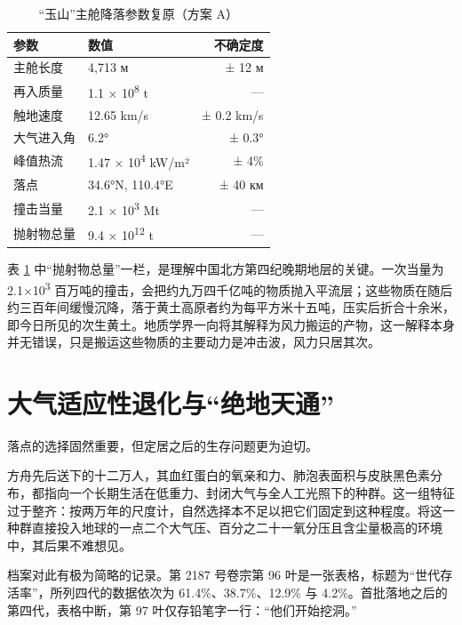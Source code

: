 \begin{table}[htbp]
\centering
\caption{“玉山”主舱降落参数复原（方案 A）}
\label{tab:landing}
\footnotesize
\begin{tabular}{@{}llr@{}}
\toprule
\textbf{参数} & \textbf{数值} & \textbf{不确定度}\\
\midrule
主舱长度 & 4{,}713 м & ± 12 м\\
再入质量 & 1.1 × 10\textsuperscript{8} t & —\\
触地速度 & 12.65 km/s & ± 0.2 km/s\\
大气进入角 & 6.2° & ± 0.3°\\
峰值热流 & 1.47 × 10\textsuperscript{4} kW/m² & ± 4\%\\
落点 & 34.6°N, 110.4°E & ± 40 км\\
撞击当量 & 2.1 × 10\textsuperscript{3} Mt & —\\
抛射物总量 & 9.4 × 10\textsuperscript{12} t & —\\
\bottomrule
\end{tabular}
\end{table}

表 \ref{tab:landing} 中“抛射物总量”一栏，是理解中国北方第四纪晚期地层的关键。一次当量为 2.1×10\textsuperscript{3} 百万吨的撞击，会把约九万四千亿吨的物质抛入平流层；这些物质在随后约三百年间缓慢沉降，落于黄土高原者约为每平方米十五吨，压实后折合十余米，即今日所见的次生黄土。地质学界一向将其解释为风力搬运的产物，这一解释本身并无错误，只是搬运这些物质的主要动力是冲击波，风力只居其次\nobreak。

\section{大气适应性退化与“绝地天通”}

落点的选择固然重要，但定居之后的生存问题更为迫切。

方舟先后送下的十二万人，其血红蛋白的氧亲和力、肺泡表面积与皮肤黑色素分布，都指向一个长期生活在低重力、封闭大气与全人工光照下的种群。这一组特征过于整齐：按两万年的尺度计，自然选择本不足以把它们固定到这种程度。将这一种群直接投入地球的一点二个大气压、百分之二十一氧分压且含尘量极高的环境中，其后果不难想见。

档案对此有极为简略的记录。第 2187 号卷宗第 96 叶是一张表格，标题为“世代存活率”，所列四代的数据依次为 61.4\%、38.7\%、12.9\% 与 4.2\%。首批落地之后的第四代，表格中断，第 97 叶仅存铅笔字一行：“他们开始挖洞。”

